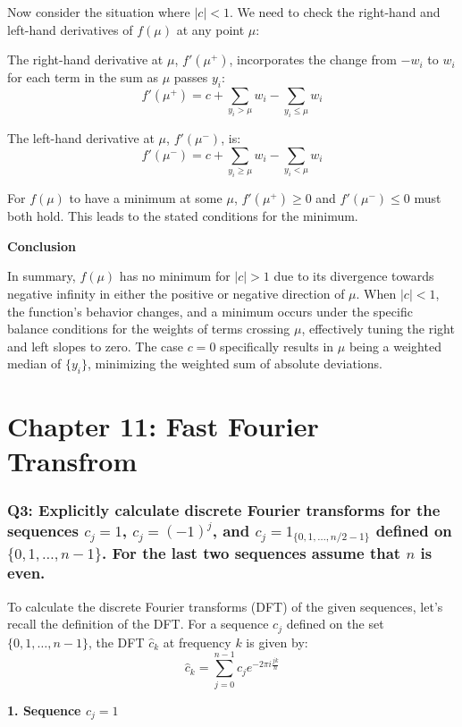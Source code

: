 \documentclass[8pt]{article}
\begin{document}
{Now consider the situation where \( |c| < 1 \). We need to check the right-hand and left-hand derivatives of \( f(\mu) \) at any point \( \mu \):

The right-hand derivative at \( \mu \), \( f'(\mu^+) \), incorporates the change from \( -w_i \) to \( w_i \) for each term in the sum as \( \mu \) passes \( y_i \):
\[
f'(\mu^+) = c + \sum_{y_i > \mu} w_i - \sum_{y_i \leq \mu} w_i
\]

The left-hand derivative at \( \mu \), \( f'(\mu^-) \), is:
\[
f'(\mu^-) = c + \sum_{y_i \geq \mu} w_i - \sum_{y_i < \mu} w_i
\]

For \( f(\mu) \) to have a minimum at some \( \mu \), \( f'(\mu^+) \geq 0 \) and \( f'(\mu^-) \leq 0 \) must both hold. This leads to the stated conditions for the minimum.

\textbf{Conclusion}

In summary, \( f(\mu) \) has no minimum for \( |c| > 1 \) due to its divergence towards negative infinity in either the positive or negative direction of \( \mu \). When \( |c| < 1 \), the function's behavior changes, and a minimum occurs under the specific balance conditions for the weights of terms crossing \( \mu \), effectively tuning the right and left slopes to zero. The case \( c = 0 \) specifically results in \( \mu \) being a weighted median of \( \{y_i\} \), minimizing the weighted sum of absolute deviations.

\newpage
\section*{Chapter 11: Fast Fourier Transfrom}

\subsubsection*{Q3:
Explicitly calculate discrete Fourier transforms for the sequences \( c_j = 1 \), \( c_j = (-1)^j \), and \( c_j = 1_{\{0,1,\ldots,n/2-1\}} \) defined on \(\{0, 1, \ldots, n-1\}\). For the last two sequences assume that \(n\) is even.}

To calculate the discrete Fourier transforms (DFT) of the given sequences, let's recall the definition of the DFT. For a sequence \( c_j \) defined on the set \( \{0, 1, \ldots, n-1\} \), the DFT \( \hat{c}_k \) at frequency \( k \) is given by:
\[
\hat{c}_k = \sum_{j=0}^{n-1} c_j e^{-2\pi i \frac{jk}{n}}
\]

\textbf{1. Sequence \( c_j = 1 \)}

}
\end{document}
